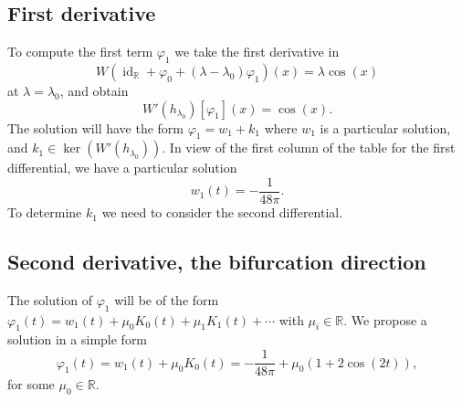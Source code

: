 \documentclass{amsart}
\def \R{\mathbb R}
\def \id{\operatorname{id}}
\begin{document}
\subsection{First derivative}

To compute the first term $\varphi_1$ we take the first derivative in
\[W(\id_\R + \varphi_0 + (\lambda-\lambda_0) \varphi_1 )(x) = \lambda \cos(x)\]
at $\lambda = \lambda_0$,
and obtain
\[
	W'(h_{\lambda_0})[\varphi_1](x) = \cos(x).
\]
The solution will have the form $\varphi_1 = w_1 + k_1$ where $w_1$ is a particular solution, and $k_1 \in \ker(W'(h_{\lambda_0}))$.
In view of the first column of the table for the first differential, we have a particular solution
\[
	w_1(t) = -\frac 1{48\pi}.
\]
To determine $k_1$ we need to consider the second differential.

\subsection{Second derivative, the bifurcation direction}

The solution of $\varphi_1$ will be of the form $\varphi_1(t) = w_1(t) + \mu_0 K_0(t) + \mu_1 K_1(t) + \cdots$ with $\mu_i \in \R$.
We propose a solution in a simple form
\[\varphi_1(t) = w_1(t) + \mu_0 K_0(t) = -\frac 1{48 \pi} + \mu_0 (1+2\cos(2t)),\]
for some $\mu_0 \in \R$.
\end{document}
